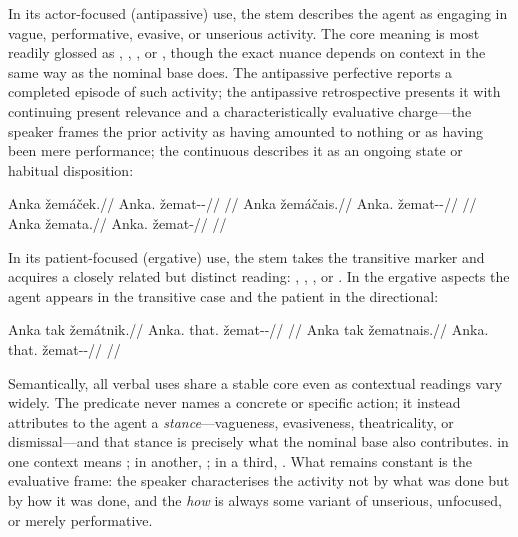 In its actor-focused (antipassive) use, the stem describes the agent as engaging
in vague, performative, evasive, or unserious activity. The core meaning is most
readily glossed as , , , or , though the exact
nuance depends on context in the same way as the nominal base does. The
antipassive perfective  reports a completed episode of such
activity; the antipassive retrospective  presents it with
continuing present relevance and a characteristically evaluative charge---the
speaker frames the prior activity as having amounted to nothing or as having
been mere performance; the continuous  describes it as an ongoing
state or habitual disposition:

\pex
\a
\begingl
\gla Anka žemáček.//
\glb Anka.\Dir{} žemat-\Antip{}-\Pf{}//
\glft {}//
\endgl
\a
\begingl
\gla Anka žemáčais.//
\glb Anka.\Dir{} žemat-\Antip{}-\Ret{}//
\glft {}//
\endgl
\a
\begingl
\gla Anka žemata.//
\glb Anka.\Dir{} žemat-\Cont{}//
\glft {}//
\endgl
\xe

In its patient-focused (ergative) use, the stem  takes the
transitive marker  and acquires a closely related but distinct reading:
, , , or . In the ergative
aspects the agent appears in the transitive case and the patient in the
directional:

\pex
\a
\begingl
\gla Anka tak žemátnik.//
\glb Anka.\Trs{} that.\Dir{} žemat-\Trs{}-\Pf{}//
\glft {}//
\endgl
\a
\begingl
\gla Anka tak žematnais.//
\glb Anka.\Trs{} that.\Dir{} žemat-\Trs{}-\Ret{}//
\glft {}//
\endgl
\xe

Semantically, all verbal uses share a stable core even as contextual readings
vary widely. The predicate never names a concrete or specific action; it instead
attributes to the agent a \emph{stance}---vagueness, evasiveness, theatricality,
or dismissal---and that stance is precisely what the nominal base also
contributes.  in one context means ; in another, ; in a third, . What remains constant is the evaluative frame: the
speaker characterises the activity not by what was done but by how it was done,
and the \textit{how} is always some variant of unserious, unfocused, or merely
performative.

